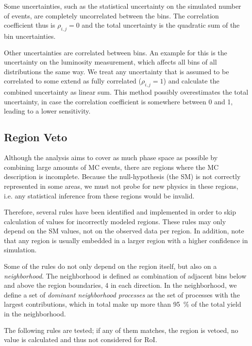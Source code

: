 Some uncertainties, such as the statistical uncertainty on the simulated number of events, are completely uncorrelated between the bins. The correlation coefficient thus is $\rho_{i,j} = 0$ and the total uncertainty is the quadratic sum of the bin uncertainties.

Other uncertainties are correlated between bins. An example for this is the uncertainty on the luminosity measurement, which affects all bins of all distributions the same way. We treat any uncertainty that is assumed to be correlated to some extend as fully correlated ($\rho_{i,j} = 1$) and calculate the combined uncertainty as linear sum. This method possibly overestimates the total uncertainty, in case the correlation coefficient is somewhere between 0 and 1, leading to a lower sensitivity.

\subsection{Region Veto}
\label{sec:region_veto}
Although the analysis aims to cover as much phase space as possible by combining large amounts of \ac{MC} events, there are regions where the \ac{MC} description is incomplete. 
Because the null-hypothesis (the \acl{SM}) is not correctly represented in some areas, we must not probe for new physics in these regions, i.e. any statistical inference from these regions would be invalid.

Therefore, several rules have been identified and implemented in order to skip calculation of \TS values for incorrectly modeled regions. These rules may only depend on the \ac{SM} values, not on the observed data per region. In addition, note that any region is usually embedded in a larger region with a higher confidence in simulation. 

Some of the rules do not only depend on the region itself, but also on a \emph{neighborhood}. The neighborhood is defined as combination of adjacent bins below and above the region boundaries, \num{4} in each direction. In the neighborhood, we define a set of \emph{dominant neighborhood processes} as the set of processes with the largest contributions, which in total make up more than \SI{95}{\percent} of the total yield in the neighborhood.

The following rules are tested; if any of them matches, the region is vetoed, no \TS value is calculated and thus not considered for \ac{RoI}.

